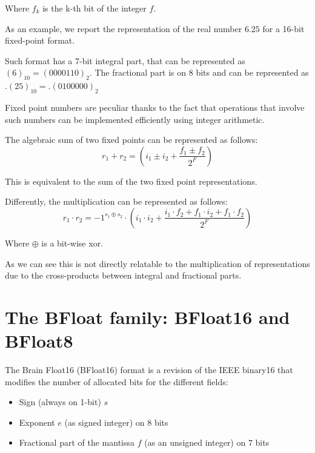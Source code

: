 Where $f_k$ is the k-th bit of the integer $f$.

As an example, we report the representation of the real number $6.25$ for a 16-bit fixed-point format.

Such format has a 7-bit integral part, that can be represented as $(6)_{10} = {(0000110)}_{2}$.
The fractional part is on 8 bits and can be represented as $ .(25)_{10} = .(0100000)_{2}$

Fixed point numbers are peculiar thanks to the fact that operations that involve such numbers can be implemented efficiently using integer arithmetic.

The algebraic sum of two fixed points can be represented as follows:
\begin{equation}\label{eqn:fixedSum}
    r_1 + r_2 = \left(i_1 \pm i_2 + \frac{f_1 \pm f_2}{2^{F}}\right)
\end{equation}

This is equivalent to the sum of the two fixed point representations.

Differently, the multiplication can be represented as follows:
\begin{equation}\label{eqn:fixedMul}
    r_1 \cdot r_2 = -1^{s_1 \oplus s_2}\cdot \left(i_1 \cdot i_2 + \frac{i_1 \cdot f_2 + f_1\cdot i_2 + f_1 \cdot f_2}{2^F}\right) 
\end{equation}

Where $\oplus$ is a bit-wise xor.

As we can see this is not directly relatable to the multiplication of representations due to the cross-products between integral and fractional parts.

\section{The BFloat family: BFloat16 and BFloat8}

The Brain Float16 (BFloat16) format \cite{burgess2019bfloat} is a revision of the IEEE binary16 that modifies the number of allocated bits for the different fields:

\begin{itemize}
    \item Sign (always on 1-bit) $s$
    \item Exponent $e$ (as signed integer) on $8$ bits
    \item Fractional part of the mantissa $f$ (as an unsigned integer) on $7$ bits
\end{itemize}

